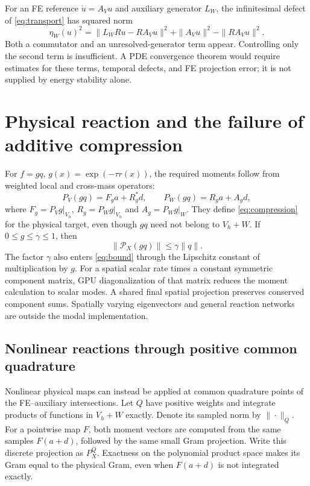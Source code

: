 \documentclass[10pt,a4paper]{article}
\newcommand{\V}{V_h}
\newcommand{\PV}{P_V}
\newcommand{\PW}{P_W}
\begin{document}
For an FE reference $\dot u=A_Vu$ and auxiliary generator $L_W$,
the infinitesimal defect of \eqref{eq:transport} has squared norm
\begin{equation}\label{eq:generator}
 \eta_W(u)^2=\|L_WRu-RA_Vu\|^2
             +\|A_Vu\|^2-\|RA_Vu\|^2.
\end{equation}
Both a commutator and an unresolved-generator term appear. Controlling
only the second term is insufficient. A PDE convergence theorem would
require estimates for these terms, temporal defects, and FE projection
error; it is not supplied by energy stability alone.

\section{Physical reaction and the failure of additive compression}
For $f=gq$, $g(x)=\exp(-\tau r(x))$, the required moments follow from
weighted local and cross-mass operators:
\begin{equation}
 \PV(gq)=F_ga+R_g^*d,\qquad
 \PW(gq)=R_ga+A_gd,
\end{equation}
where $F_g=\PV g|_{\V}$, $R_g=\PW g|_{\V}$ and
$A_g=\PW g|_W$. They define \eqref{eq:compression} for the physical
target, even though $gq$ need not belong to $\V+W$.
If $0\leq g\leq\gamma\leq1$, then
\[
 \|\mathcal P_X(gq)\|\leq\gamma\|q\|.
\]
The factor $\gamma$ also enters \eqref{eq:bound} through the
Lipschitz constant of multiplication by $g$. For a spatial scalar
rate times a constant symmetric component matrix, GPU diagonalization
of that matrix reduces the moment calculation to scalar modes. A
shared final spatial projection preserves conserved component sums.
Spatially varying eigenvectors and general reaction networks are
outside the modal implementation.

\subsection{Nonlinear reactions through positive common quadrature}
Nonlinear physical maps can instead be applied at common quadrature
points of the FE--auxiliary intersections. Let $Q$ have positive weights
and integrate products of functions in $\V+W$ exactly. Denote its sampled
norm by $\|\cdot\|_Q$. For a pointwise map $F$, both moment vectors
are computed from the same samples $F(a+d)$, followed by the same
small Gram projection. Write this discrete projection as $P_X^Q$.
Exactness on the polynomial product space makes its Gram equal to
the physical Gram, even when $F(a+d)$ is not integrated exactly.
\end{document}
